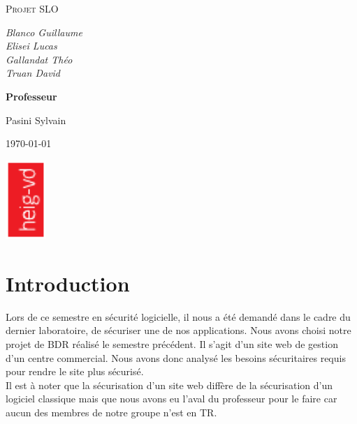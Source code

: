 \documentclass[a4paper]{article}
\date{\today}
\begin{document}
\thispagestyle{empty}

\begin{titlepage}
\center

    \vspace{1cm}
    {\scshape\LARGE Projet SLO \\
        \vspace{0.5cm}}

    \vspace{0.5cm}
    {\itshape Blanco Guillaume \\ Elisei Lucas \\ Gallandat Théo  \\ Truan David\par}

    \vspace{1cm}
    \textbf{Professeur}\par
    Pasini Sylvain\par
    \vspace{3cm}

    {\large \today\par}
    \vspace{3cm}
    \includegraphics[height=3cm,angle=-90]{img/logo-HEIG-VD.pdf}
\end{titlepage}

\setcounter{page}{1}

\section{Introduction}

Lors de ce semestre en sécurité logicielle, il nous a été demandé dans le cadre du dernier laboratoire, de sécuriser une de nos applications. Nous avons choisi notre projet de BDR réalisé le semestre précédent. Il s'agit d'un site web de gestion d'un centre commercial. Nous avons donc analysé les besoins sécuritaires requis pour rendre le site plus sécurisé.\\
Il est à noter que la sécurisation d'un site web diffère de la sécurisation d'un logiciel classique mais que nous avons eu l'aval du professeur pour le faire car aucun des membres de notre groupe n'est en TR.
\end{document}
